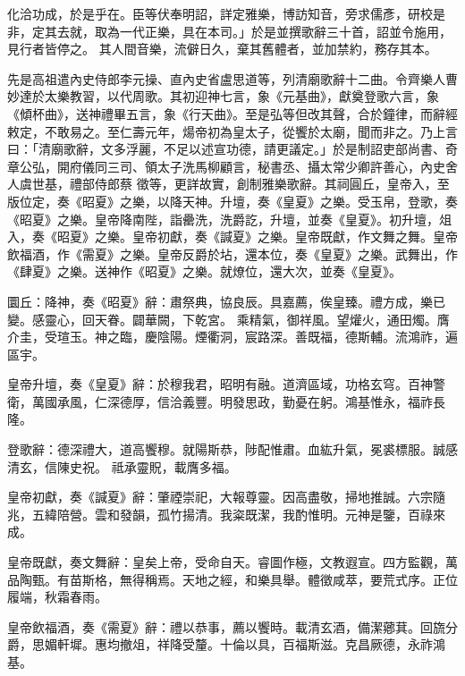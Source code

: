 \begin{pinyinscope}
 化洽功成，於是乎在。臣等伏奉明詔，詳定雅樂，博訪知音，旁求儒彥，研校是非，定其去就，取為一代正樂，具在本司。」於是並撰歌辭三十首，詔並令施用，見行者皆停之。
 其人間音樂，流僻日久，棄其舊體者，並加禁約，務存其本。



 先是高祖遣內史侍郎李元操、直內史省盧思道等，列清廟歌辭十二曲。令齊樂人曹妙達於太樂教習，以代周歌。其初迎神七言，象《元基曲》，獻奠登歌六言，象《傾杯曲》，送神禮畢五言，象《行天曲》。至是弘等但改其聲，合於鐘律，而辭經敕定，不敢易之。至仁壽元年，煬帝初為皇太子，從饗於太廟，聞而非之。乃上言曰：「清廟歌辭，文多浮麗，不足以述宣功德，請更議定。」於是制詔吏部尚書、奇章公弘，開府儀同三司、領太子洗馬柳顧言，秘書丞、攝太常少卿許善心，內史舍人虞世基，禮部侍郎蔡
 徵等，更詳故實，創制雅樂歌辭。其祠圓丘，皇帝入，至版位定，奏《昭夏》之樂，以降天神。升壇，奏《皇夏》之樂。受玉帛，登歌，奏《昭夏》之樂。皇帝降南陛，詣罍洗，洗爵訖，升壇，並奏《皇夏》。初升壇，俎入，奏《昭夏》之樂。皇帝初獻，奏《諴夏》之樂。皇帝既獻，作文舞之舞。皇帝飲福酒，作《需夏》之樂。皇帝反爵於坫，還本位，奏《皇夏》之樂。武舞出，作《肆夏》之樂。送神作《昭夏》之樂。就燎位，還大次，並奏《皇夏》。



 圜丘：降神，奏《昭夏》辭：肅祭典，協良辰。具嘉薦，俟皇臻。禮方成，樂已變。感靈心，回天眷。闢華闕，下乾宮。
 乘精氣，御祥風。望爟火，通田燭。膺介圭，受瑄玉。神之臨，慶陰陽。煙衢洞，宸路深。善既福，德斯輔。流鴻祚，遍區宇。



 皇帝升壇，奏《皇夏》辭：於穆我君，昭明有融。道濟區域，功格玄穹。百神警衛，萬國承風，仁深德厚，信洽義豐。明發思政，勤憂在躬。鴻基惟永，福祚長隆。



 登歌辭：德深禮大，道高饗穆。就陽斯恭，陟配惟肅。血紘升氣，冕裘標服。誠感清玄，信陳史祝。
 祗承靈貺，載膺多福。



 皇帝初獻，奏《諴夏》辭：肇禋崇祀，大報尊靈。因高盡敬，掃地推誠。六宗隨兆，五緯陪營。雲和發韻，孤竹揚清。我粢既潔，我酌惟明。元神是鑒，百祿來成。



 皇帝既獻，奏文舞辭：皇矣上帝，受命自天。睿圖作極，文教遐宣。四方監觀，萬品陶甄。有苗斯格，無得稱焉。天地之經，和樂具舉。體徵咸萃，要荒式序。正位履端，秋霜春雨。



 皇帝飲福酒，奏《需夏》辭：禮以恭事，薦以饗時。載清玄酒，備潔薌萁。回旒分爵，思媚軒墀。惠均撤俎，祥降受釐。十倫以具，百福斯滋。克昌厥德，永祚鴻基。




\end{pinyinscope}
